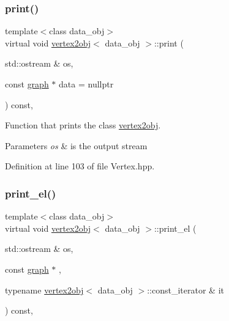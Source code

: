 \mbox{\label{structvertex2obj_a650c769f8be6474398b43a30ba5ef8ee}} 
\subsubsection{\texorpdfstring{print()}{print()}}
{\footnotesize\ttfamily template$<$class data\+\_\+obj$>$ \\
virtual void \hyperlink{structvertex2obj}{vertex2obj}$<$ data\+\_\+obj $>$\+::print (\begin{DoxyParamCaption}\item[{std\+::ostream \&}]{os,  }\item[{const \hyperlink{structgraph}{graph} $\ast$}]{data = {\ttfamily nullptr} }\end{DoxyParamCaption}) const\hspace{0.3cm}{\ttfamily [inline]}, {\ttfamily [virtual]}}



Function that prints the class \hyperlink{structvertex2obj}{vertex2obj}. 


\begin{DoxyParams}{Parameters}
{\em os} & is the output stream \\
\hline
\end{DoxyParams}


Definition at line 103 of file Vertex.\+hpp.

\mbox{\label{structvertex2obj_a2cfa844f7671d7b698495e6078879d9b}} 
\subsubsection{\texorpdfstring{print\+\_\+el()}{print\_el()}}
{\footnotesize\ttfamily template$<$class data\+\_\+obj$>$ \\
virtual void \hyperlink{structvertex2obj}{vertex2obj}$<$ data\+\_\+obj $>$\+::print\+\_\+el (\begin{DoxyParamCaption}\item[{std\+::ostream \&}]{os,  }\item[{const \hyperlink{structgraph}{graph} $\ast$}]{,  }\item[{typename \hyperlink{structvertex2obj}{vertex2obj}$<$ data\+\_\+obj $>$\+::const\+\_\+iterator \&}]{it }\end{DoxyParamCaption}) const\hspace{0.3cm}{\ttfamily [inline]}, {\ttfamily [virtual]}}



